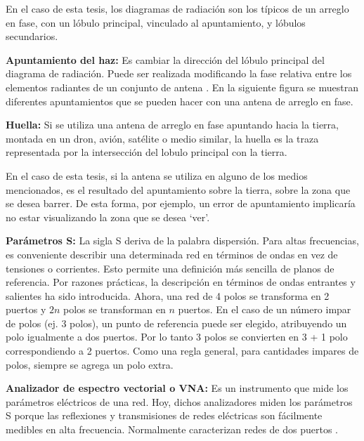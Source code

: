 En el caso de esta tesis, los diagramas de radiación son los típicos de un arreglo en fase, con un lóbulo principal, vinculado
al apuntamiento, y lóbulos secundarios.

{\textbf{Apuntamiento del haz:}} Es cambiar la dirección del lóbulo principal del diagrama de radiación. Puede ser realizada 
modificando la fase relativa entre los elementos radiantes de un conjunto de antena \cite{Standard1996}. En la siguiente figura 
se muestran diferentes apuntamientos que se pueden hacer con una antena de arreglo en fase. 


{\textbf{Huella:}} Si se utiliza una antena de arreglo en fase apuntando hacia la tierra, montada en un dron, avión, satélite o
medio similar, la huella es la traza representada por la intersección del lobulo principal con la tierra. 


En el caso de esta tesis, si la antena se utiliza en alguno de los medios mencionados, es el resultado del apuntamiento sobre la
tierra, sobre la zona que se desea barrer. De esta forma, por ejemplo, un error de apuntamiento implicaría no estar visualizando
la zona que se desea \enquote*{ver}.

{\textbf{Parámetros S:}} La sigla S deriva de la palabra dispersión. Para altas frecuencias, es conveniente describir una 
determinada red en términos de ondas en vez de tensiones o corrientes. Esto permite una definición más sencilla de planos de
referencia. Por razones prácticas, la descripción en términos de ondas entrantes y salientes ha sido introducida. Ahora, una
red de 4 polos se transforma en 2 puertos y $2n$ polos se transforman en $n$ puertos. En el caso de un número impar de polos
(ej. 3 polos), un punto de referencia puede ser elegido, atribuyendo un polo igualmente a dos puertos. Por lo tanto 3 polos se
convierten en 3 + 1 polo correspondiendo a 2 puertos. Como una regla general, para cantidades impares de polos, siempre se agrega
un polo extra.

{\textbf{Analizador de espectro vectorial o VNA:}} Es un instrumento que mide los parámetros eléctricos de una red. Hoy, dichos
analizadores miden los parámetros S porque las reflexiones y transmisiones de redes eléctricas son fácilmente medibles en alta
frecuencia. Normalmente caracterizan redes de dos puertos \cite{NetworkAnalyzer}.


